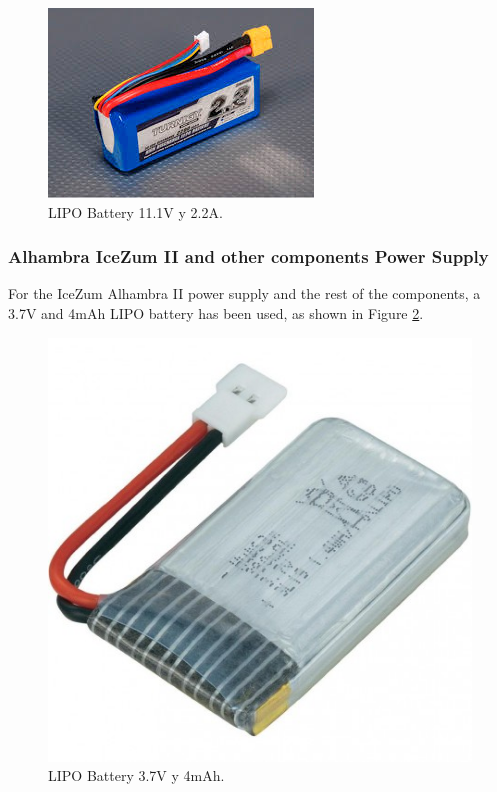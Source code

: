 \begin{center}
	\begin{figure}[H]
		\center
		\includegraphics[scale=0.8]{imagenes/Balancing_Robot/LIPO111}
		\caption{LIPO Battery 11.1V y 2.2A. }
		\label{fig:lipo111}
	\end{figure}
\end{center}

\subsubsection{Alhambra IceZum II and other components Power Supply}

For the IceZum Alhambra II power supply and the rest of the components, a 3.7V and 4mAh LIPO battery has been used, as shown in Figure \ref{fig:lipo37}. 
\begin{center}
	\begin{figure}[H]
		\center
		\includegraphics[scale=0.5]{imagenes/Balancing_Robot/LIPO37}
		\caption{LIPO Battery 3.7V y 4mAh.}
		\label{fig:lipo37}
	\end{figure}
\end{center}

